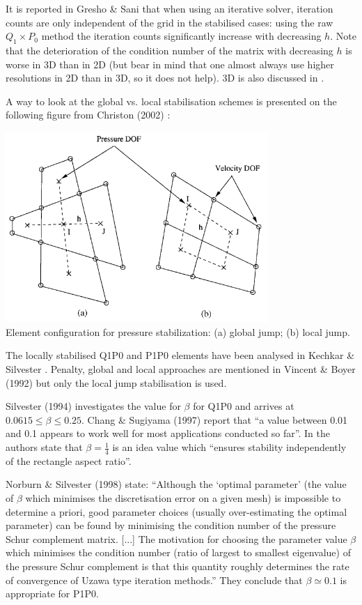 It is reported in Gresho \& Sani \cite{grsa} that when using an iterative solver, iteration counts
are only independent of the grid in the stabilised cases: using the raw $Q_1\times P_0$ method the iteration counts significantly increase with decreasing $h$. Note that the deterioration of the condition number of the matrix with decreasing $h$ is worse in 3D than in 2D (but
bear in mind that one almost always use higher resolutions in 2D than in 3D, so it does not help). 3D is also discussed in \cite{chsu97}.

A way to look at the global vs. local stabilisation schemes is presented
on the following figure from Christon (2002) \cite{chri02}:

\begin{center}
\includegraphics[width=10cm]{images/q1p0stab/chri02}\\
{\captionfont Element configuration for pressure stabilization: (a) global jump; (b) local jump.}
\end{center}

\begin{remark}
The locally stabilised Q1P0 and P1P0 elements have been analysed in Kechkar \& Silvester \cite{kesi92}. Penalty, global and local approaches are mentioned in Vincent \& Boyer (1992) but only the local jump
stabilisation is used. 
\end{remark}

Silvester (1994) investigates the value for $\beta$ for Q1P0 and 
arrives at $0.0615 \leq \beta \le 0.25$.
Chang \& Sugiyama (1997) report that ``a value between 0.01 and 0.1 appears to work well for most applications conducted so far''.
In \cite{elsw} the authors state that $\beta=\frac14$ is an idea value which ``ensures stability independently of the rectangle aspect ratio''.

Norburn \& Silvester (1998) state: ``Although the ‘optimal parameter’ (the value of $\beta$ which minimises the discretisation error on a given mesh) is impossible to determine a priori, good parameter choices (usually over-estimating the optimal parameter) can be
found by minimising the condition number of the pressure Schur complement matrix. [...]
The motivation for choosing the parameter value $\beta$ which minimises the condition number (ratio of largest to smallest eigenvalue) of the pressure Schur complement is that this quantity roughly determines the rate of convergence of Uzawa type iteration methods.'' They conclude that $\beta \simeq 0.1$ is appropriate for P1P0.

